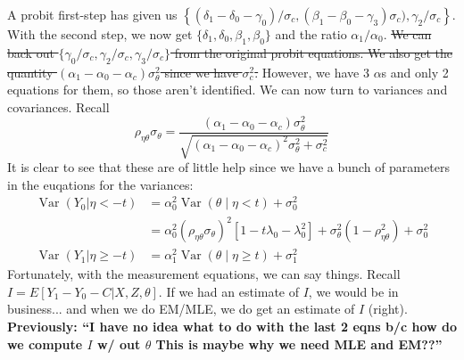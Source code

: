 \documentclass[11pt,letterpaper]{article}
\DeclareMathOperator{\Var}{Var}
\begin{document}
A probit first-step has given us $\left\{ (\delta_1 - \delta_0 -\gamma_0)/\sigma_c, (\beta_1 - \beta_0 - \gamma_3)\sigma_c), \gamma_2/\sigma_c \right\}$. With the second step, we now get $\{\delta_1, \delta_0, \beta_1, \beta_0\}$ and the ratio $\alpha_1/\alpha_0$. \sout{We can back out $\{\gamma_0/\sigma_c, \gamma_2/\sigma_c, \gamma_3/\sigma_c\}$ from the original probit equations. We also get the quantity $(\alpha_1 - \alpha_0 - \alpha_c)\sigma^2_\theta$ since we have $\sigma_c^2$.} However, we have 3 $\alpha$s and only 2 equations for them, so those aren't identified. We can now turn to variances and covariances. Recall
\[
\rho_{\eta\theta}\sigma_\theta = \frac{(\alpha_1 - \alpha_0 - \alpha_c)\sigma^2_\theta}{\sqrt{(\alpha_1 - \alpha_0 - \alpha_c)^2\sigma^2_\theta + \sigma^2_c}}
\]
It is clear to see that these are of little help since we have a bunch of parameters in the euqations for the variances: 
\begin{align*}
\Var (Y_0| \eta  <  -t ) 
	&= \alpha_0^2 \Var\left(\theta\middle| \eta <    t\right) + \sigma^2_0  \\
	&= \alpha_0^2 \left( \rho_{\eta\theta}\sigma_\theta \right)^2 \left[1 - t \lambda_0 - \lambda_0^2 \right] + \sigma^2_\theta \left( 1- \rho_{\eta\theta}^2\right) + \sigma^2_0\\
\Var (Y_1| \eta\geq -t ) &= \alpha_1^2 \Var\left(\theta\middle| \eta \geq t\right) + \sigma^2_1 
\end{align*}
Fortunately, with the measurement equations, we can say things. Recall $I=E[Y_1 - Y_0 - C|X,Z,\theta]$. If we had an estimate of $I$, we would be in business... and when we do EM/MLE, we do get an estimate of $I$ (right). \textbf{Previously: ``I have no idea what to do with the last 2 eqns b/c how do we compute $I$ w/ out $\theta$ This is maybe why we need MLE and EM??''}
\end{document}
